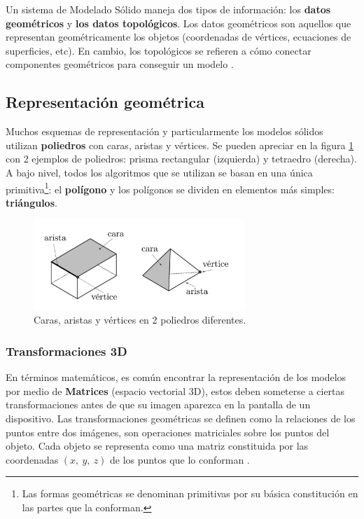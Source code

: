 Un sistema de Modelado Sólido maneja dos tipos de información: los \textbf{datos geométricos} y \textbf{los datos topológicos}. Los datos geométricos son aquellos que representan geométricamente los objetos (coordenadas de vértices, ecuaciones de superficies, etc). En cambio, los topológicos se refieren a cómo conectar componentes geométricos para conseguir un modelo \citep{Ramos2011}.

\subsection{Representación geométrica}
\label{repGeo}

Muchos esquemas de representación y particularmente los modelos sólidos utilizan \textbf{poliedros} \citep{cromwell1999polyhedra} con caras, aristas y vértices. Se pueden apreciar en la figura \ref{fig:poli} con 2 ejemplos de poliedros: prisma rectangular (izquierda) y tetraedro (derecha).
A bajo nivel, todos los algoritmos que se utilizan se basan en una única primitiva\footnote{Las formas geométricas se denominan  primitivas por su básica constitución en las partes que la conforman.}: el \textbf{polígono} y los polígonos se dividen en elementos más simples: \textbf{triángulos}.

\begin{figure}[ht]
\includegraphics[width=8cm]{Img/GEO/geo-vertex.jpg}
\centering
\caption{\footnotesize{Caras, aristas y vértices en 2 poliedros diferentes.}}
\label{fig:poli}
\end{figure}


\subsubsection{Transformaciones 3D}
En términos matemáticos, es común encontrar la representación de los modelos por medio de \textbf{Matrices} \citep{Gabriela2008} (espacio vectorial 3D), estos deben someterse a ciertas transformaciones antes de que su imagen aparezca en la pantalla de un dispositivo. Las transformaciones geométricas se definen como la relaciones de los puntos entre dos imágenes, son operaciones matriciales sobre los puntos del objeto. Cada  objeto se representa como una matriz constituida por las coordenadas $(x,\ y,\ z)$ de los puntos que lo conforman  \citep{villamarin2015}.

